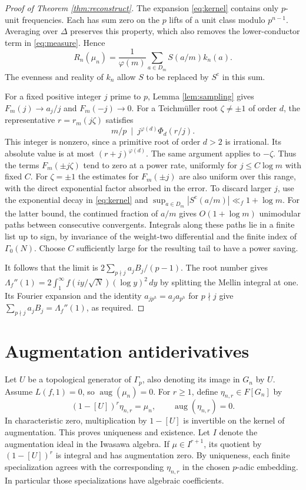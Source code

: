 \documentclass[11pt]{article}
\newcommand{\aug}{\operatorname{aug}}
\begin{document}
\begin{proof}[Proof of Theorem \ref{thm:reconstruct}]
The expansion \eqref{eq:kernel} contains only \(p\)-unit frequencies.
Each has sum zero on the \(p\) lifts of a unit class modulo \(p^{n-1}\).
Averaging over \(\Delta\) preserves this property, which also removes
the lower-conductor term in \eqref{eq:measure}. Hence
\[
 R_n(\mu_n)=\frac{1}{\varphi(m)}\sum_{a\in D_m}S(a/m)k_n(a).
\]
The evenness and reality of \(k_n\) allow \(S\) to be replaced by
\(S^{\mathrm c}\) in this sum.

For a fixed positive integer \(j\) prime to \(p\), Lemma
\ref{lem:sampling} gives \(F_m(j)\to a_j/j\) and \(F_m(-j)\to0\).
For a Teichm\"uller root \(\zeta\ne\pm1\) of order \(d\), the
representative \(r=r_m(j\zeta)\) satisfies
\[
 m/p\ \mid\ j^{\varphi(d)}\Phi_d(r/j).
\]
This integer is nonzero, since a primitive root of order \(d>2\) is
irrational. Its absolute value is at most \((r+j)^{\varphi(d)}\).
The same argument applies to \(-\zeta\). Thus the terms
\(F_m(\pm j\zeta)\) tend to zero at a power rate, uniformly for
\(j\le C\log m\) with fixed \(C\). For \(\zeta=\pm1\) the estimates for
\(F_m(\pm j)\) are also uniform over this range, with the direct
exponential factor absorbed in the error. To discard larger \(j\),
use the exponential decay in \eqref{eq:kernel} and
\(\sup_{a\in D_m}|S^{\mathrm c}(a/m)|\ll_f 1+\log m\).
For the latter bound, the continued fraction of \(a/m\) gives
\(O(1+\log m)\) unimodular paths between consecutive convergents.
Integrals along these paths lie in a finite list up to sign, by
invariance of the weight-two differential and the finite index of
\(\Gamma_0(N)\). Choose \(C\) sufficiently large for the resulting
tail to have a power saving.

It follows that the limit is \(2\sum_{p\nmid j}a_j B_j/(p-1)\).
The root number gives
\(\Lambda_f''(1)=2\int_1^\infty f(iy/\sqrt N)(\log y)^2\,dy\)
by splitting the Mellin integral at one. Its Fourier expansion and
the identity \(a_{jp^h}=a_j a_{p^h}\) for \(p\nmid j\) give
\(\sum_{p\nmid j}a_j B_j=\Lambda_f''(1)\), as required.
\end{proof}

\section{Augmentation antiderivatives}

Let \(U\) be a topological generator of \(\Gamma_p\), also denoting
its image in \(G_n\) by \(U\). Assume \(L(f,1)=0\), so
\(\aug(\mu_n)=0\). For \(r\ge1\), define \(\eta_{n,r}\in F[G_n]\)
by
\[
 (1-[U])^r\eta_{n,r}=\mu_n,\qquad \aug(\eta_{n,r})=0.
\]
In characteristic zero, multiplication by \(1-[U]\) is invertible
on the kernel of augmentation. This proves uniqueness and existence.
Let \(I\) denote the augmentation ideal in the Iwasawa algebra.
If \(\mu\in I^{r+1}\), its quotient by \((1-[U])^r\) is integral
and has augmentation zero. By uniqueness, each finite specialization
agrees with the corresponding \(\eta_{n,r}\) in the chosen
\(p\)-adic embedding. In particular those specializations have
algebraic coefficients.
\end{document}
